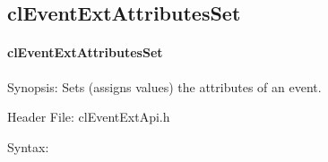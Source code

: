 \begin{flushleft}
\subsection{clEventExtAttributesSet}
\hypertarget{pageem203}{}\paragraph{cl\-Event\-Ext\-Attributes\-Set}\label{pageem203}
\begin{Desc}
\item[Synopsis:]Sets (assigns values) the attributes of an event.\end{Desc}
\begin{Desc}
\item[Header File:]clEventExtApi.h\end{Desc}
\begin{Desc}
\item[Syntax:]


\end{Desc}
\end{flushleft}
